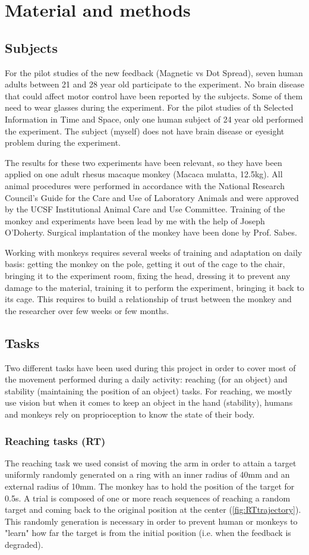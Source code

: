 \documentclass[preprint,12pt]{elsarticle}
\begin{document}
\section{Material and methods}
\subsection{Subjects}
For the pilot studies of the new feedback (Magnetic vs Dot Spread), seven human adults between 21 and 28 year old participate to the experiment. No brain disease that could affect motor control have been reported by the subjects. Some of them need to wear glasses during the experiment. For the pilot studies of th Selected Information in Time and Space, only one human subject of 24 year old performed the experiment. The subject (myself) does not have brain disease or eyesight problem during the experiment.

The results for these two experiments have been relevant, so they have been applied on one adult rhesus macaque monkey (Macaca mulatta, 12.5kg). All animal procedures were performed in accordance with the National Research Council’s Guide for the Care and Use of Laboratory Animals and were approved by the UCSF Institutional Animal Care and Use Committee. Training of the monkey and experiments have been lead by me with the help of Joseph O'Doherty. Surgical implantation of the monkey have been done by Prof. Sabes.

Working with monkeys requires several weeks of training and adaptation on daily basis: getting the monkey on the pole, getting it out of the cage to the chair, bringing it to the experiment room, fixing the head, dressing it to prevent any damage to the material, training it to perform the experiment, bringing it back to its cage. This requires to build a relationship of trust between the monkey and the researcher over few weeks or few months.

\subsection{Tasks}
Two different tasks have been used during this project in order to cover most of the movement performed during a daily activity: reaching (for an object) and stability (maintaining the position of an object) tasks. For reaching, we mostly use vision but when it comes to keep an object in the hand (stability), humans and monkeys rely on proprioception to know the state of their body.
\subsubsection{Reaching tasks (RT)}
The reaching task we used consist of moving the arm in order to attain a target uniformly randomly generated on a ring with an inner radius of 40mm and an external radius of 10mm. The monkey has to hold the position of the target for 0.5s. A trial is composed of one or more reach sequences of reaching a random target and coming back to the original position at the center (\ref{fig:RTtrajectory}). This randomly generation is necessary in order to prevent human or monkeys to "learn" how far the target is from the initial position (i.e. when the feedback is degraded).
\end{document}
